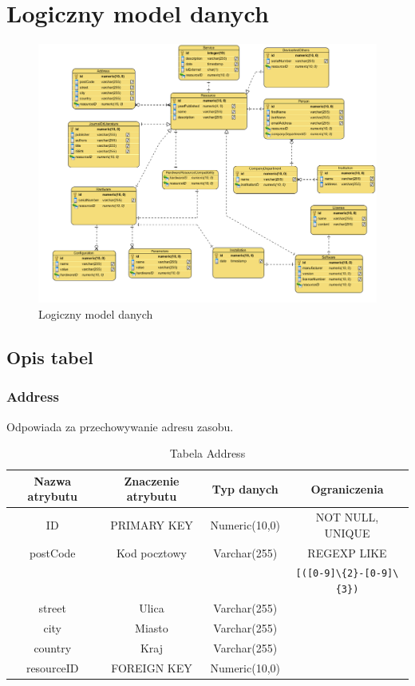 \section{Logiczny model danych}

\begin{figure}[h!]
	\centering
	\includegraphics[scale=0.57, angle=270]{img/diagrams/LDM/LDM}
	\caption{Logiczny model danych\label{fig:labelLDM}}
\end{figure}
\bigskip
\subsection{Opis tabel}

\subsubsection{Address}
Odpowiada za przechowywanie adresu zasobu.
\begin{table}[H]
	\renewcommand\arraystretch{1.5}
	\renewcommand\tabcolsep{1.5pt}
\begin{tabular}{| c | c | c | c |} 
	\hline \textbf{Nazwa atrybutu} & \textbf{Znaczenie atrybutu} & \textbf{Typ danych} & \textbf{Ograniczenia} \\ 
	\hline ID & PRIMARY KEY & Numeric(10,0) & NOT NULL, UNIQUE \\ 
	\hline postCode & Kod pocztowy & Varchar(255) & REGEXP LIKE \\
	~ & ~ & ~ & \verb|[([0-9]\{2}-[0-9]\{3})| \\ 
	\hline street & Ulica & Varchar(255) &  \\ 
	\hline city & Miasto & Varchar(255) & \\ 
	\hline country & Kraj & Varchar(255) &  \\ 
	\hline resourceID & FOREIGN KEY & Numeric(10,0) & \\ 
	\hline 
\end{tabular}
\caption{Tabela Address}
\label{TAB:Address}
\end{table} 

